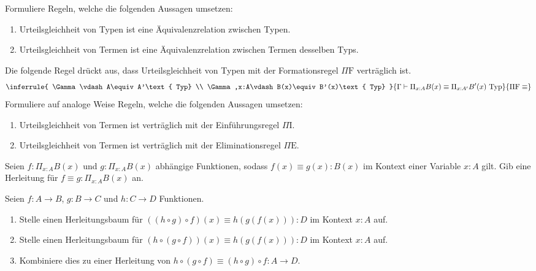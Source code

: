 \documentclass{uebung}
\begin{document}

\begin{exercise}
  Formuliere Regeln, welche die folgenden Aussagen umsetzen:
  \begin{enumerate}
    \item Urteilsgleichheit von Typen ist eine Äquivalenzrelation zwischen Typen.
    \item Urteilsgleichheit von Termen ist eine Äquivalenzrelation zwischen Termen desselben Typs.
  \end{enumerate}
  Die folgende Regel drückt aus, dass Urteilsgleichheit von Typen mit der Formationsregel $\Pi\mathrm{F}$ verträglich ist.
  $$
  \inferrule{
    \Gamma\vdash A\equiv A'\text{ Typ} \\ \Gamma,x:A\vdash B(x)\equiv B'(x)\text{ Typ}
  }{
    \Gamma\vdash \Pi_{x:A}B(x)\equiv\Pi_{x:A'}B'(x)\text{ Typ}
  }{
    \Pi\mathrm{F}\equiv
  }
  $$
  Formuliere auf analoge Weise Regeln, welche die folgenden Aussagen umsetzen:
  \begin{enumerate}[start=3]
    \item Urteilsgleichheit von Termen ist verträglich mit der Einführungsregel $\Pi\mathrm{I}$.
    \item Urteilsgleichheit von Termen ist verträglich mit der Eliminationsregel $\Pi\mathrm{E}$.
  \end{enumerate}
\end{exercise}

\begin{exercise}
  Seien $f:\Pi_{x:A}B(x)$ und $g:\Pi_{x:A}B(x)$ abhängige Funktionen, sodass $f(x)\equiv g(x):B(x)$ im Kontext einer Variable $x:A$ gilt.
  Gib eine Herleitung für $f\equiv g:\Pi_{x:A}B(x)$ an.
\end{exercise}

\begin{exercise}
  Seien $f:A\to B$, $g:B\to C$ und $h:C\to D$ Funktionen.
  \begin{enumerate}
    \item Stelle einen Herleitungsbaum für $((h\circ g)\circ f)(x)\equiv h(g(f(x))):D$ im Kontext $x:A$ auf.
    \item Stelle einen Herleitungsbaum für $(h\circ (g\circ f))(x)\equiv h(g(f(x))):D$ im Kontext $x:A$ auf.
    \item Kombiniere dies zu einer Herleitung von $h\circ(g\circ f)\equiv (h\circ g)\circ f:A\to D$.
  \end{enumerate}
\end{exercise}
\end{document}
